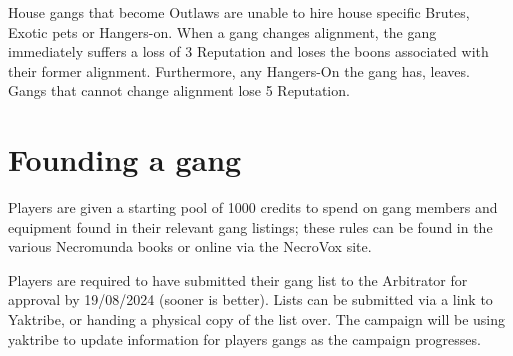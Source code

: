 \documentclass[a4paper]{article}
\begin{document}
	House gangs that become Outlaws are unable to hire house specific Brutes, Exotic pets or Hangers-on. When a gang changes alignment, the gang immediately suffers a loss of 3 Reputation and loses the boons associated with their former alignment. Furthermore, any Hangers-On the gang has, leaves. Gangs that cannot change alignment lose 5 Reputation.
	\pagebreak
	\section*{Founding a gang}
	Players are given a starting pool of 1000 credits to spend on gang members and equipment found in their relevant gang listings; these rules can be found in the various Necromunda books or online via the NecroVox site.

	Players are required to have submitted their gang list to the Arbitrator for approval by 19/08/2024 (sooner is better). Lists can be submitted via a link to Yaktribe, or handing a physical copy of the list over. The campaign will be using yaktribe to update information for players gangs as the campaign progresses.
\end{document}
